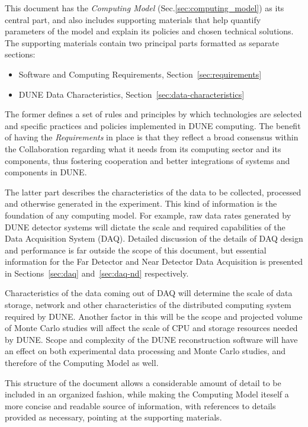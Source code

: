 This document has the \textit{Computing Model} (Sec.\ref{sec:computing_model}) as its central part, and also
includes supporting materials that help quantify parameters of the model and explain its policies and
chosen technical solutions. The supporting materials contain two principal parts formatted as separate sections:
\begin{itemize}
\item Software and Computing Requirements, Section~\ref{sec:requirements}
\item DUNE Data Characteristics, Section~\ref{sec:data-characteristics}
\end{itemize}

\noindent
The former defines a set of rules and principles by which technologies are selected and specific practices and policies implemented in DUNE computing.
The benefit of having the \textit{Requirements} in place is that they reflect a broad consensus within the Collaboration regarding what it needs from
its computing sector and its components, thus fostering cooperation and better integrations of systems and components in DUNE.

The latter part describes the characteristics of the data to be collected, processed and otherwise generated in the experiment.
This kind of information is the foundation of any computing model.
For example, raw data rates generated by DUNE detector systems will dictate the scale and required capabilities of the Data
Acquisition System (DAQ).  Detailed discussion of the details of DAQ design and performance is far outside the scope of this
document, but essential information for the Far Detector and Near Detector Data Acquisition is presented in Sections~\ref{sec:daq}
and~\ref{sec:daq-nd} respectively.

Characteristics of the data coming out of DAQ will determine the scale of data storage, network
and other characteristics of the distributed computing system required by DUNE. Another factor in this will be the scope and projected
volume of Monte Carlo studies  will affect the scale of CPU and storage resources needed by DUNE.  Scope and complexity of the DUNE
reconstruction software will have an effect on both experimental data processing and Monte Carlo studies, and therefore of the
Computing Model as well.

This structure of the document allows a considerable amount of detail to be included in an organized fashion,
while making the Computing Model iteself a more concise and readable source of information, with
references to details provided as necessary, pointing at the supporting materials.

